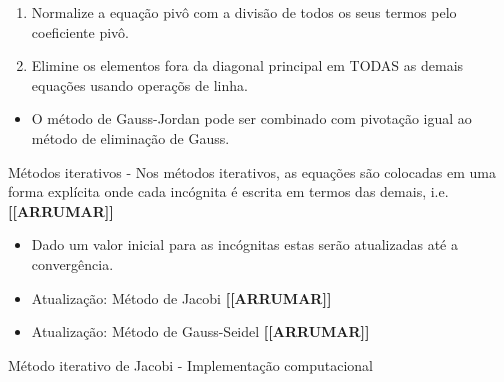 \documentclass[
]{article}
\providecommand{\tightlist}{%
  \setlength{\itemsep}{0pt}\setlength{\parskip}{0pt}}
\begin{document}
\begin{enumerate}
\def\labelenumi{\arabic{enumi}.}
\tightlist
\item
  Normalize a equação pivô com a divisão de todos os seus termos pelo
  coeficiente pivô.
\item
  Elimine os elementos fora da diagonal principal em TODAS as demais
  equações usando operaçõs de linha.
\end{enumerate}

\begin{itemize}
\tightlist
\item
  O método de Gauss-Jordan pode ser combinado com pivotação igual ao
  método de eliminação de Gauss.
\end{itemize}

Métodos iterativos - Nos métodos iterativos, as equações são colocadas
em uma forma explícita onde cada incógnita é escrita em termos das
demais, i.e. \textbf{{[}{[}ARRUMAR{]}{]}}

\begin{itemize}
\item
  Dado um valor inicial para as incógnitas estas serão atualizadas até a
  convergência.
\item
  Atualização: Método de Jacobi \textbf{{[}{[}ARRUMAR{]}{]}}
\item
  Atualização: Método de Gauss-Seidel \textbf{{[}{[}ARRUMAR{]}{]}}
\end{itemize}

Método iterativo de Jacobi - Implementação computacional
\end{document}
